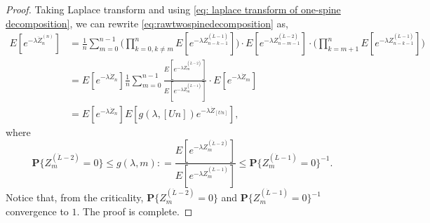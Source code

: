 \documentclass[12pt,a4paper]{amsart}
\numberwithin{equation}{section}
\begin{document}
\begin{proof}
	Taking Laplace transform and using \eqref{eq: laplace transform of one-spine decomposition}, we can rewrite \eqref{eq:rawtwospinedecomposition} as,
\begin{equation} \label{eq:laplacetransformationoftwospinedecomposition} \begin{split}
	E [ e^{- \lambda \ddot Z_n^{(n)}} ]
	&= \frac{1}{n}\sum_{m=0}^{n-1} \Big( \prod_{k=0,k\neq m}^{n} E[e^{-\lambda Z^{(\dot L - 1)}_{n-k-1}}] \Big) \cdot E [e^{-\lambda Z^{(\ddot L - 2)}_{n-m-1}}] \cdot \Big(\prod_{k= m+1}^n E [e^{-\lambda Z^{(\dot L - 1)}_{n-k-1}}]\Big)
	\\&= E [e^{-\lambda \dot Z_n}]  \frac{1}{n}\sum_{m=0}^{n-1}   \frac{ E [e^{-\lambda Z^{(\ddot L - 2)}_{m}}] }{ E[e^{-\lambda Z^{(\dot L - 1)}_{m}}] } \cdot E[e^{- \lambda \dot Z_{m}}]
	\\&= E [e^{-\lambda \dot Z_n}] E[g(\lambda, [Un])e^{-\lambda \dot Z_{[Un]}}],
\end{split}
\end{equation}
	where 
\[
	\mathbf P\{Z^{(\ddot L - 2)}_m=0\}
	\leq	g(\lambda,m) 
	: = \frac{ E [e^{-\lambda Z^{(\ddot L - 2)}_{m}}] }{ E[e^{-\lambda Z^{(\dot L - 1)}_{m}}] }
	\leq \mathbf P\{Z^{(\dot L - 1)}_m = 0\}^{-1}.
\]
	Notice that, from the criticality, $\mathbf P\{Z^{(\ddot L - 2)}_m=0\}$ and $\mathbf P\{Z^{(\dot L - 1)}_m = 0\}^{-1}$ convergence to $1$. 
	The proof is complete.
\end{proof}
\end{document}
